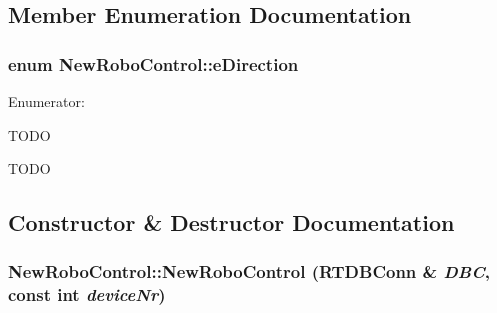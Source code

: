 \subsection{Member Enumeration Documentation}
\hypertarget{classNewRoboControl_a077fa253b827c190e82c1ce1e4c8d18f}{
\subsubsection[{eDirection}]{\setlength{\rightskip}{0pt plus 5cm}enum {\bf NewRoboControl::eDirection}}}
\label{classNewRoboControl_a077fa253b827c190e82c1ce1e4c8d18f}
\begin{Desc}
\item[Enumerator: ]\par
\begin{description}
\item[{\em 
\hypertarget{classNewRoboControl_a077fa253b827c190e82c1ce1e4c8d18fac7af9b70b7504bd260f486172de934d9}{
FORWARD}
\label{classNewRoboControl_a077fa253b827c190e82c1ce1e4c8d18fac7af9b70b7504bd260f486172de934d9}
}]TODO \item[{\em 
\hypertarget{classNewRoboControl_a077fa253b827c190e82c1ce1e4c8d18faa55a679c9e8fbc7400c88ce3cab09c48}{
BACKWARD}
\label{classNewRoboControl_a077fa253b827c190e82c1ce1e4c8d18faa55a679c9e8fbc7400c88ce3cab09c48}
}]TODO \end{description}
\end{Desc}



\subsection{Constructor \& Destructor Documentation}
\hypertarget{classNewRoboControl_a81f7ad52f88ea8fb90eeff5650efa1c5}{
\subsubsection[{NewRoboControl}]{\setlength{\rightskip}{0pt plus 5cm}NewRoboControl::NewRoboControl (RTDBConn \& {\em DBC}, \/  const int {\em deviceNr})}}
\label{classNewRoboControl_a81f7ad52f88ea8fb90eeff5650efa1c5}

